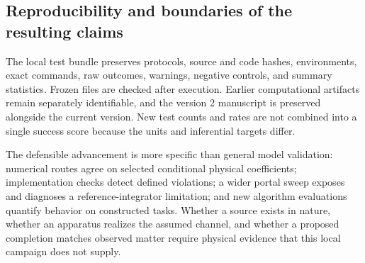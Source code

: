 \subsection{Reproducibility and boundaries of the resulting claims}
The local test bundle preserves protocols, source and code hashes, environments, exact commands, raw outcomes, warnings, negative controls, and summary statistics. Frozen files are checked after execution. Earlier computational artifacts remain separately identifiable, and the version 2 manuscript is preserved alongside the current version. New test counts and rates are not combined into a single success score because the units and inferential targets differ.

The defensible advancement is more specific than general model validation: numerical routes agree on selected conditional physical coefficients; implementation checks detect defined violations; a wider portal sweep exposes and diagnoses a reference-integrator limitation; and new algorithm evaluations quantify behavior on constructed tasks. Whether a source exists in nature, whether an apparatus realizes the assumed channel, and whether a proposed completion matches observed matter require physical evidence that this local campaign does not supply.
